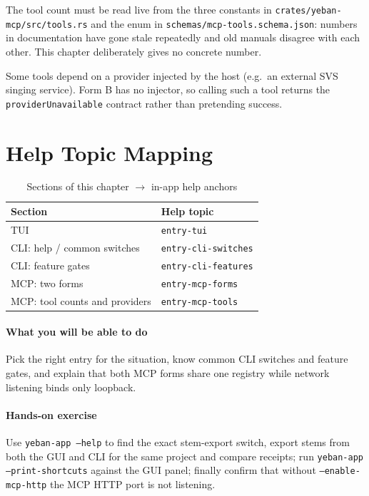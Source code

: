The tool count must be read live from the three constants in
\texttt{crates/yeban-mcp/src/tools.rs} and the enum in
\texttt{schemas/mcp-tools.schema.json}: numbers in documentation have gone stale
repeatedly and old manuals disagree with each other. This chapter deliberately gives
no concrete number.

Some tools depend on a provider injected by the host (e.g.\ an external SVS singing
service). Form B has no injector, so calling such a tool returns the
\texttt{providerUnavailable} contract rather than pretending success.

\section{Help Topic Mapping}

\begin{table}[htbp]
\centering
\caption{Sections of this chapter $\to$ in-app help anchors}
\label{tab:ch10-help}
\begin{tabular}{ll}
\hline
Section & Help topic \\
\hline
TUI & \texttt{entry-tui} \\
CLI: help / common switches & \texttt{entry-cli-switches} \\
CLI: feature gates & \texttt{entry-cli-features} \\
MCP: two forms & \texttt{entry-mcp-forms} \\
MCP: tool counts and providers & \texttt{entry-mcp-tools} \\
\hline
\end{tabular}
\end{table}

\paragraph{What you will be able to do} Pick the right entry for the situation, know common CLI switches and feature gates, and explain that both MCP forms share one registry while network listening binds only loopback.

\paragraph{Hands-on exercise} Use \texttt{yeban-app --help} to find the exact stem-export switch, export stems from both the GUI and CLI for the same project and compare receipts; run \texttt{yeban-app --print-shortcuts} against the GUI panel; finally confirm that without \texttt{--enable-mcp-http} the MCP HTTP port is not listening.
